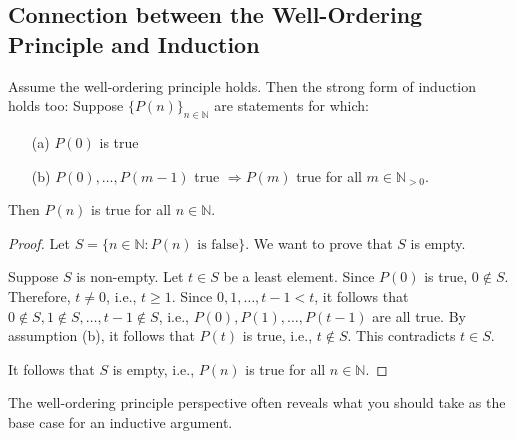 \documentclass[11pt]{article}
\begin{document}
\subsection{Connection between the Well-Ordering Principle and Induction}

\begin{theorem}

    Assume the well-ordering principle holds. Then the strong form of induction
    holds too: Suppose $\{P(n)\}_{n \in \mathbb{N}}$ are statements for which:

    \begin{itemize}
        \item[(a)] $P(0)$ is true
        \item[(b)] $P(0), \ldots, P(m-1)$ true $\Rightarrow P(m)$ true for all $m \in \mathbb{N}_{>0}$.
    \end{itemize}

    Then $P(n)$ is true for all $n \in \mathbb{N}$.
\end{theorem}
\begin{proof}
    Let $S = \{ n \in \mathbb{N} : P(n) \text{ is false} \}$. We want to prove that $S$ is empty.

    Suppose $S$ is non-empty. Let $t \in S$ be a least element. Since $P(0)$ is
    true, $0 \notin S$. Therefore, $t \neq 0$, i.e., $t \geq 1$. Since $0, 1,
        \ldots, t-1 < t$, it follows that $0 \notin S, 1 \notin S, \ldots, t-1 \notin
        S$, i.e., $P(0), P(1), \ldots, P(t-1)$ are all true. By assumption (b), it
    follows that $P(t)$ is true, i.e., $t \notin S$. This contradicts $t \in S$.

    It follows that $S$ is empty, i.e., $P(n)$ is true for all $n \in \mathbb{N}$.
\end{proof}
The well-ordering principle perspective often reveals what you should take as
the base case for an inductive argument.
\end{document}
